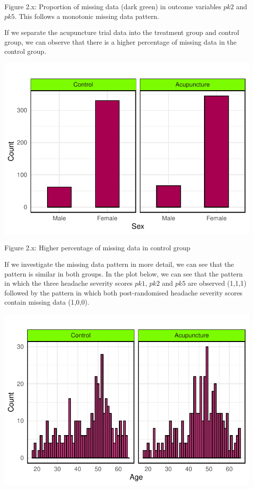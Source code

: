 \documentclass{article}
\begin{document}
Figure 2.x: Proportion of missing data (dark green) in outcome variables
\(pk2\) and \(pk5\). This follows a monotonic missing data pattern.

If we separate the acupuncture trial data into the treatment group and
control group, we can observe that there is a higher percentage of
missing data in the control group.

\includegraphics{Final_Report_files/figure-latex/unnamed-chunk-9-1.pdf}

Figure 2.x: Higher percentage of missing data in control group

If we investigate the missing data pattern in more detail, we can see
that the pattern is similar in both groups. In the plot below, we can
see that the pattern in which the three headache severity scores
\(pk1\), \(pk2\) and \(pk5\) are observed (1,1,1) followed by the
pattern in which both post-randomised headache severity scores contain
missing data (1,0,0).

\includegraphics{Final_Report_files/figure-latex/unnamed-chunk-10-1.pdf}
\end{document}
